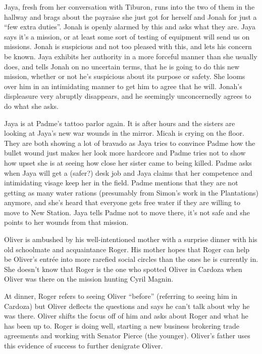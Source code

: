 Jaya, fresh from her conversation with Tiburon, runs into the two of them in the hallway and brags about the payraise she just got for herself and Jonah for just a ``few extra duties''.  Jonah is openly alarmed by this and asks what they are.  Jaya says it's a mission, or at least some sort of testing of equipment will send us on missions.  Jonah is suspicious and not too pleased with this, and lets his concern be known.  Jaya exhibits her authority in a more forceful manner than she usually does, and tells Jonah on no uncertain terms, that he is going to do this new mission, whether or not he's suspicious about its purpose or safety.  She looms over him in an intimidating manner to get him to agree that he will.  Jonah's displeasure very abruptly disappears, and he seemingly unconcernedly agrees to do what she asks.






Jaya is at Padme's tattoo parlor again.  It is after hours and the sisters are looking at Jaya's new war wounds in the mirror.  Micah is crying on the floor.  They are both showing a lot of bravado as Jaya tries to convince Padme how the bullet wound just makes her look more hardcore and Padme tries not to show how upset she is at seeing how close her sister came to being killed.  Padme asks when Jaya will get a (safer?) desk job and Jaya claims that her competence and intimidating visage keep her in the field.  Padme mentions that they are not getting as many water rations (presumably from Simon's work in the Plantations) anymore, and she's heard that everyone gets free water if they are willing to move to New Station.  Jaya tells Padme not to move there, it's not safe and she points to her wounds from that mission.



Oliver is ambushed by his well-intentioned mother with a surprise dinner with his old schoolmate and acquaintance Roger.  His mother hopes that Roger can help be Oliver's entrée into more rarefied social circles than the ones he is currently in.  She doesn't know that Roger is the one who spotted Oliver in Cardoza when Oliver was there on the mission hunting Cyril Magnin.  



At dinner, Roger refers to seeing Oliver ``before'' (referring to seeing him in Cardoza) but Oliver deflects the questions and says he can't talk about why he was there. Oliver shifts the focus off of him and asks about Roger and what he has been up to.  Roger is doing well, starting a new business brokering trade agreements and working with Senator Pierce (the younger).  Oliver's father uses this evidence of success to further denigrate Oliver.  



